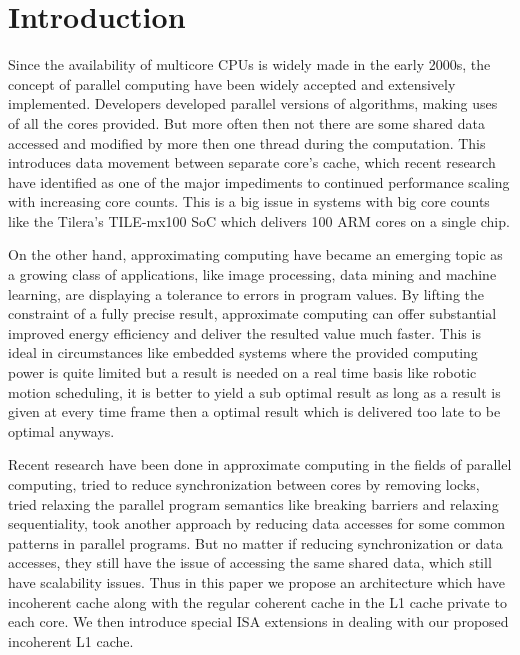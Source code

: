 \documentclass[12pt,conference]{IEEEtran}
\begin{document}
%
\IEEEpeerreviewmaketitle



\section{Introduction}

Since the availability of multicore CPUs is widely made in the
early 2000s, the concept of parallel computing have been widely accepted 
and extensively implemented. Developers developed parallel versions
of algorithms, making uses of all the cores provided. But more often then not
there are some shared data accessed and modified by more then one
thread during the computation. This introduces data movement between
separate core's cache, which recent research have identified as one of the major
impediments to continued performance scaling with increasing core counts. This
is a big issue in systems with big core counts like the Tilera's TILE-mx100 SoC 
which delivers 100 ARM cores on a single chip\cite{tile}.

On the other hand, approximating computing have became an emerging topic
as a growing class of applications, like image processing, data mining 
and machine learning, are displaying a tolerance to errors in program values.
By lifting the constraint of a fully precise result, approximate computing
can offer substantial improved energy efficiency and deliver the resulted
value much faster. This is ideal in circumstances like embedded systems where
the provided computing power is quite limited but a result is needed on a real
time basis like robotic motion scheduling, it is better to yield a sub optimal 
result as long as a result is given at every time frame then a optimal result
which is delivered too late to be optimal anyways.

Recent research have been done in approximate computing in the fields of
parallel computing, \cite{ibm} tried to reduce synchronization between cores 
by removing locks, \cite{helixup} tried relaxing the parallel program 
semantics like breaking barriers and relaxing sequentiality, \cite{paraprox}
took another approach by reducing data accesses for some common patterns in
parallel programs. But no matter if reducing synchronization or data accesses,
they still have the issue of accessing the same shared data, which still
have scalability issues. Thus in this paper we propose an architecture which
have incoherent cache along with the regular coherent cache in the L1 cache
private to each core. We then introduce special ISA extensions in dealing with
our proposed incoherent L1 cache.
\end{document}
